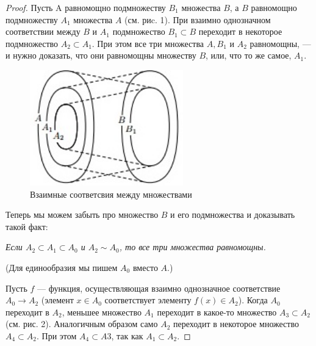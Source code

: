 \documentclass[a4paper, 12pt]{article}
\begin{document}
\begin{proof}
 
 
 Пусть A равномощно подмножеству $B_1$ множества $B$, а $B$ равномощно подмножеству $A_1$ множества $A$ (см. риc. 1). При взаимно однозначном соответствии между $B$ и $A_1$ подмножество $B_1 \subset B$ переходит в некоторое подмножество $A_2 \subset A_1$. При этом все три множества $A, B_1$ и $A_2$ равномощны, --- и нужно доказать, что они равномощны множеству $B$, или, что то же самое, $A_1$.
 
 \begin{figure}[h]
\begin{center}
\begin{minipage}[h]{0.4\linewidth}
 \includegraphics[height=5cm, width=\linewidth]{images/kantorbern1.jpg}
 \caption{Взаимные соответсвия между множествами}
 \end{minipage}
 \end{center}
 \end{figure}
 
 Теперь мы можем забыть про множество $B$ и его подмножества и доказывать такой факт:
 
 \textit{Если $A_2 \subset A_1 \subset A_0$ и $A_2 \sim A_0$, то все три множества
равномощны.}

 (Для единообразия мы пишем $A_0$ вместо $A$.)
 
 Пусть $f$ — функция, осуществляющая взаимно однозначное соответствие $A_0 \rightarrow A_2$ (элемент $x \in A_0$ соответствует элементу $f(x) \in A_2$). Когда $A_0$ переходит в $A_2$, меньшее множество $A_1$ переходит в какое-то множество $A_3 \subset A_2$ (см. рис. 2). Аналогичным образом само $A_2$ переходит в некоторое множество $A_4 \subset A_2$. При этом $A_4 \subset A3$, так как $A_1 \subset A_2$.


\end{proof}
\end{document}
